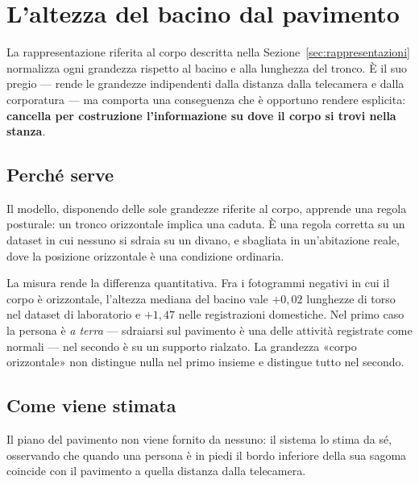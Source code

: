 
\section{L'altezza del bacino dal pavimento}
\label{sec:pavimento}

La rappresentazione riferita al corpo descritta nella
Sezione~\ref{sec:rappresentazioni} normalizza ogni grandezza rispetto al
bacino e alla lunghezza del tronco. È il suo pregio — rende le grandezze
indipendenti dalla distanza dalla telecamera e dalla corporatura — ma comporta
una conseguenza che è opportuno rendere esplicita: \textbf{cancella per
costruzione l'informazione su dove il corpo si trovi nella stanza}.

\subsection{Perché serve}

Il modello, disponendo delle sole grandezze riferite al corpo, apprende una
regola posturale: un tronco orizzontale implica una caduta. È una regola
corretta su un dataset in cui nessuno si sdraia su un divano, e sbagliata in
un'abitazione reale, dove la posizione orizzontale è una condizione ordinaria.

La misura rende la differenza quantitativa. Fra i fotogrammi negativi in cui il
corpo è orizzontale, l'altezza mediana del bacino vale $+0{,}02$ lunghezze di
torso nel dataset di laboratorio e $+1{,}47$ nelle registrazioni domestiche.
Nel primo caso la persona è \emph{a terra} — sdraiarsi sul pavimento è una delle
attività registrate come normali — nel secondo è su un supporto rialzato. La
grandezza «corpo orizzontale» non distingue nulla nel primo insieme e distingue
tutto nel secondo.

\subsection{Come viene stimata}

Il piano del pavimento non viene fornito da nessuno: il sistema lo stima da sé,
osservando che quando una persona è in piedi il bordo inferiore della sua sagoma
coincide con il pavimento a quella distanza dalla telecamera.

